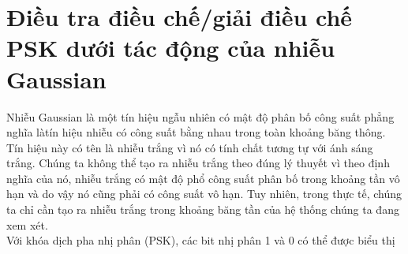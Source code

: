 \section{ Điều tra điều chế/giải điều chế PSK dưới tác động của nhiễu Gaussian }
Nhiễu Gaussian là một tín hiệu ngẫu nhiên có mật độ phân bố công suất phẳng nghĩa làtín hiệu nhiễu có công suất bằng nhau trong toàn khoảng băng thông. Tín hiệu này có tên là nhiễu trắng vì nó có tính chất tương tự với ánh sáng trắng. Chúng ta không thể tạo ra nhiễu trắng theo đúng lý thuyết vì theo định nghĩa của nó, nhiễu trắng có mật độ phổ công suất phân bố trong khoảng tần vô hạn và do vậy nó cũng phải có công suất vô hạn. Tuy nhiên, trong thực tế, chúng ta chỉ cần tạo ra nhiễu trắng trong khoảng băng tần của hệ thống chúng ta đang xem xét. \\ 
Với khóa dịch pha nhị phân (PSK), các bit nhị phân 1 và 0 có thể được biểu thị
